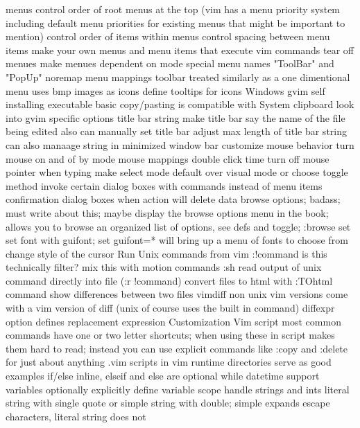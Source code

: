 \documentclass[12pt]{book}
\begin{document}
{{    menus
      control order of root menus at the top (vim has a menu priority system including default menu priorities for existing menus that might be important to mention)
      control order of items within menus
      control spacing between menu items
      make your own menus and menu items that execute vim commands
      tear off menues
      make menues dependent on mode
      special menu names "ToolBar" and "PopUp"
      noremap menu mappings
    toolbar
      treated similarly as a one dimentional menu
      uses bmp images as icons
      define tooltips for icons
    Windows gvim
      self installing executable
      basic copy/pasting is compatible with System clipboard
    look into gvim specific options
    title bar string
      make title bar say the name of the file being edited
      also can manually set title bar
      adjust max length of title bar string
      can also manaage string in minimized window bar
    customize mouse behavior
      turn mouse on and of by mode
      mouse mappings
      double click time
      turn off mouse pointer when typing
    make select mode default over visual mode or choose toggle method
    invoke certain dialog boxes with commands instead of menu items
    confirmation dialog boxes when action will delete data
    browse options; badass; must write about this; maybe display the browse options menu in the book; allows you to browse an organized list of options, see defs and toggle; :browse set
    set font with guifont; set guifont=* will bring up a menu of fonts to choose from
    change style of the cursor
  Run Unix commands from vim
    :!command
      is this technically filter?
      mix this with motion commands
    :sh
    read output of unix command directly into file (:r !command)
  convert files to html with :TOhtml command
  show differences between two files
    vimdiff
    non unix vim versions come with a vim version of diff (unix of course uses the built in command)
    diffexpr option defines replacement expression
Customization
  Vim script
    most common commands have one or two letter shortcuts; when using these in script makes them hard to read; instead you can use explicit commands like :copy and :delete for just about anything
    .vim scripts in vim runtime directories serve as good examples
    if/else
      inline, elseif and else are optional
    while
    datetime support
    variables
      optionally explicitly define variable scope
      handle strings and ints
      literal string with single quote or simple string with double; simple expands escape characters, literal string does not
}}
\end{document}
